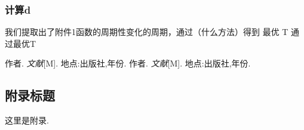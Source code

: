\documentclass[12pt, a4paper, oneside]{ctexart}
\begin{document}
	\subsubsection{计算d}
	我们提取出了附件1函数的周期性变化的周期，通过（什么方法）得到 最优 T
	通过最优T
	\newpage
	
	\begin{thebibliography}{99}
		作者. \emph{文献}[M]. 地点:出版社,年份.
		作者. \emph{文献}[M]. 地点:出版社,年份.
	\end{thebibliography}
	
	\newpage
	
	\begin{appendices}
		\renewcommand{\thesection}{\Alph{section}}
		\section{附录标题}
		这里是附录. 
	\end{appendices}
	
\end{document}
